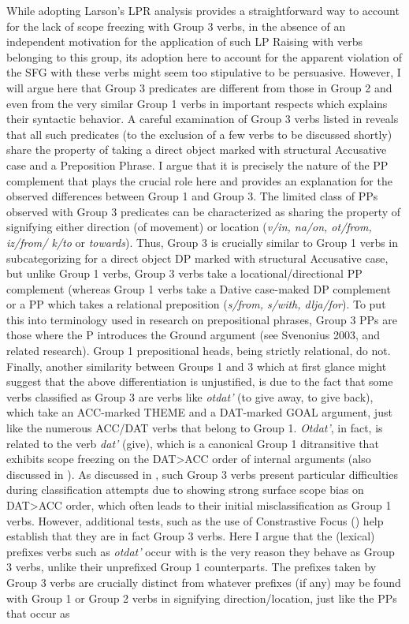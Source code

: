 \documentclass[output=paper,colorlinks,citecolor=brown]{./langscibook}
\begin{document}
  While adopting Larson's LPR analysis provides a straightforward way to account for the lack of scope freezing with Group 3 verbs, in the absence of an independent motivation for the application of such LP Raising with verbs belonging to this group, its adoption here to account for the apparent violation of the SFG with these verbs might seem too stipulative to be persuasive. However, I will argue here that Group 3 predicates are different from those in Group 2 and even from the very similar Group 1 verbs in important respects which explains their syntactic behavior. A careful examination of Group 3 verbs listed in  reveals that all such predicates (to the exclusion of a few verbs to be discussed shortly) share the property of taking a direct object marked with structural Accusative case and a Preposition Phrase. I argue that it is precisely the nature of the PP complement that plays the crucial role here and provides an explanation for the observed differences between Group 1 and Group 3. The limited class of PPs observed with Group 3 predicates can be characterized as sharing the property of signifying either direction (of movement) or location (\textit{v/in, na/on, ot/from, iz/from/ k/to} or \textit{towards}). Thus, Group 3 is crucially similar to Group 1 verbs in subcategorizing for a direct object DP marked with structural Accusative case, but unlike Group 1 verbs, Group 3 verbs take a locational/directional PP complement (whereas Group 1 verbs take a Dative case-maked DP complement or a PP which takes a relational preposition (\textit{s/from, s/with, dlja/for}). To put this into terminology used in research on prepositional phrases, Group 3 PPs are those where the P introduces the Ground argument (see Svenonius 2003, \citeyear{Svenonius2007} and related research). Group 1 prepositional heads, being strictly relational, do not. Finally, another similarity between Groups 1 and 3 which at first glance might suggest that the above differentiation is unjustified, is due to the fact that some verbs classified as Group 3 are verbs like \textit{otdat'} (to give away, to give back), which take an ACC-marked THEME and a DAT-marked GOAL argument, just like the numerous ACC/DAT verbs that belong to Group 1. \textit{Otdat'}, in fact, is related to the verb \textit{dat'} (give), which is a canonical Group 1 ditransitive that exhibits scope freezing on the DAT>ACC order of internal arguments (also discussed in \citealt{BonehNash2017}). As discussed in \citet{Antonyuk2015}, such Group 3 verbs present particular difficulties during classification attempts due to showing strong surface scope bias on DAT>ACC order, which often leads to their initial misclassification as Group 1 verbs. However, additional tests, such as the use of Constrastive Focus (\citealt{AntonyukLarson2016}) help establish that they are in fact Group 3 verbs. Here I argue that the (lexical) prefixes verbs such as \textit{otdat'} occur with is the very reason they behave as Group 3 verbs, unlike their unprefixed Group 1 counterparts. The prefixes taken by Group 3 verbs are crucially distinct from whatever prefixes (if any) may be found with Group 1 or Group 2 verbs in signifying direction/location, just like the PPs that occur as 
\end{document}
